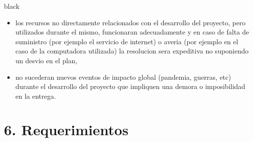 \documentclass[
11pt, %
]{charter}
\begin{document}
\begin{consigna}{black}
\begin{itemize}
	\item los recursos no directamente relacionados con el desarrollo del proyecto, pero utilizados durante el mismo, funcionaran adecuadamente y en caso de falta de suministro (por ejemplo el servicio de internet) o averia (por ejemplo en el caso de la computadora utilizada) la resolucion sera expeditiva no suponiendo un desvio en el plan,
	\item no sucederan nuevos eventos de impacto global (pandemia, guerras, etc) durante el desarrollo del proyecto que impliquen una demora o imposibilidad en la entrega.
\end{itemize}


\end{consigna}

\section{6. Requerimientos}
\label{sec:requerimientos}
\end{document}
